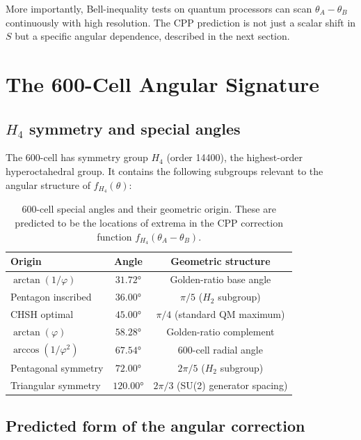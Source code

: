 \documentclass[11pt,a4paper]{article}
\newcommand{\phig}{\varphi}
\begin{document}
More importantly, Bell-inequality tests on quantum processors can
scan $\theta_A - \theta_B$ continuously with high resolution.
The CPP prediction is not just a scalar shift in $S$ but a specific
angular dependence, described in the next section.

\section{The 600-Cell Angular Signature}
\label{sec:angular}

\subsection{$H_4$ symmetry and special angles}

The 600-cell has symmetry group $H_4$ (order 14400), the highest-order
hyperoctahedral group.  It contains the following subgroups relevant
to the angular structure of $f_{H_4}(\theta)$:

\begin{table}[H]
\centering
\caption{600-cell special angles and their geometric origin.
  These are predicted to be the locations of extrema in the CPP
  correction function $f_{H_4}(\theta_A - \theta_B)$.}
\label{tab:angles}
\begin{tabular}{@{}lcc@{}}
\toprule
Origin & Angle & Geometric structure \\
\midrule
$\arctan(1/\phig)$ & $31.72°$ & Golden-ratio base angle \\
Pentagon inscribed & $36.00°$ & $\pi/5$ ($H_2$ subgroup) \\
CHSH optimal & $45.00°$ & $\pi/4$ (standard QM maximum) \\
$\arctan(\phig)$ & $58.28°$ & Golden-ratio complement \\
$\arccos(1/\phig^2)$ & $67.54°$ & 600-cell radial angle \\
Pentagonal symmetry & $72.00°$ & $2\pi/5$ ($H_2$ subgroup) \\
Triangular symmetry & $120.00°$ & $2\pi/3$ (SU(2) generator spacing) \\
\bottomrule
\end{tabular}
\end{table}

\subsection{Predicted form of the angular correction}
\end{document}
